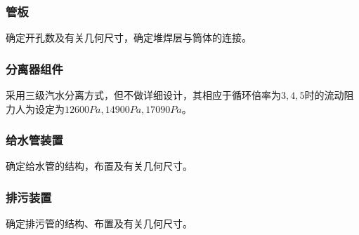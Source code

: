 \subsubsection{管板}
确定开孔数及有关几何尺寸，确定堆焊层与筒体的连接。

\subsubsection{分离器组件}
采用三级汽水分离方式，但不做详细设计，其相应于循环倍率为$ 3,4,5 $时的流动阻力人为设定为$ 12600Pa,14900Pa,17090Pa $。
\subsubsection{给水管装置}
确定给水管的结构，布置及有关几何尺寸。

\subsubsection{排污装置}
确定排污管的结构、布置及有关几何尺寸。